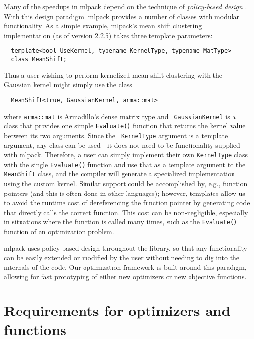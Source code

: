 \documentclass{article}
\begin{document}
Many of the speedups in mlpack depend on the technique of {\it policy-based
design} \cite{Alexandrescu2001}.  With this design paradigm, mlpack
provides a number of classes with modular functionality.  As a simple example,
mlpack's mean shift clustering implementation (as of version 2.2.5) takes three
template parameters:

\begin{verbatim}
  template<bool UseKernel, typename KernelType, typename MatType>
  class MeanShift;
\end{verbatim}

Thus a user wishing to perform kernelized mean shift clustering with the
Gaussian kernel might simply use the class

\begin{verbatim}
  MeanShift<true, GaussianKernel, arma::mat>
\end{verbatim}

\noindent where {\tt arma::mat} is Armadillo's dense matrix type and {\tt
GaussianKernel} is a class that provides one simple {\tt Evaluate()} function
that returns the kernel value between its two arguments.  Since the {\tt
KernelType} argument is a template argument, any class can be used---it does not
need to be functionality supplied with mlpack.  Therefore, a user can simply
implement their own {\tt KernelType} class with the single {\tt Evaluate()}
function and use that as a template argument to the {\tt MeanShift} class, and
the compiler will generate a specialized implementation using the custom kernel.
Similar support could be accomplished by, e.g., function pointers (and this is
often done in other languages); however, templates allow us to avoid the runtime
cost of dereferencing the function pointer by generating code that directly
calls the correct function. This cost can be non-negligible, especially in
situations where the function is called many times, such as the {\tt Evaluate()}
function of an optimization problem.

mlpack uses policy-based design throughout the library, so that any
functionality can be easily extended or modified by the user without needing to
dig into the internals of the code.  Our optimization framework is built around
this paradigm, allowing for fast prototyping of either new optimizers or new
objective functions.

\section{Requirements for optimizers and functions}
\end{document}
